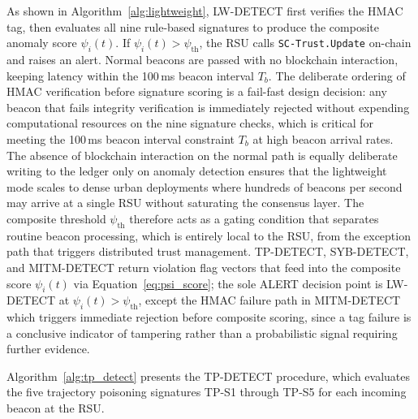 \documentclass[12pt, a4paper]{report}
\begin{document}
As shown in Algorithm~\ref{alg:lightweight}, LW-DETECT first verifies
the HMAC tag, then evaluates all nine rule-based signatures to produce
the composite anomaly score $\psi_i(t)$. If $\psi_i(t) >
\psi_{\mathrm{th}}$, the RSU calls \texttt{SC-Trust.Update} on-chain
and raises an alert. Normal beacons are passed with no blockchain
interaction, keeping latency within the 100\,ms beacon interval $T_b$.
The deliberate ordering of HMAC verification before signature scoring
is a fail-fast design decision: any beacon that fails integrity
verification is immediately rejected without expending computational
resources on the nine signature checks, which is critical for meeting
the 100\,ms beacon interval constraint $T_b$ at high beacon arrival
rates. The absence of blockchain interaction on the normal path is
equally deliberate writing to the ledger only on anomaly detection
ensures that the lightweight mode scales to dense urban deployments
where hundreds of beacons per second may arrive at a single RSU without
saturating the consensus layer. The composite threshold $\psi_{\mathrm{th}}$ therefore acts as a
gating condition that separates routine beacon processing, which is
entirely local to the RSU, from the exception path that triggers
distributed trust management.
TP-DETECT, SYB-DETECT, and MITM-DETECT return violation flag
vectors that feed into the composite score $\psi_i(t)$ via
Equation~\ref{eq:psi_score}; the sole ALERT decision point is
LW-DETECT at $\psi_i(t) > \psi_{\mathrm{th}}$, except the HMAC
failure path in MITM-DETECT which triggers immediate rejection
before composite scoring, since a tag failure is a conclusive
indicator of tampering rather than a probabilistic signal
requiring further evidence.

Algorithm~\ref{alg:tp_detect} presents the TP-DETECT procedure, which
evaluates the five trajectory poisoning signatures TP-S1 through TP-S5
for each incoming beacon at the RSU.
\end{document}

